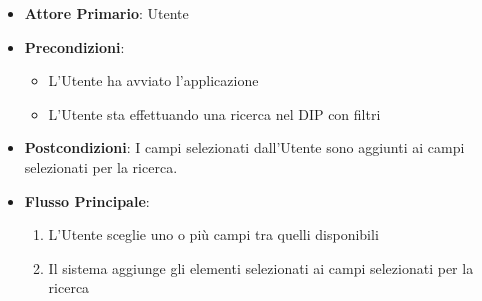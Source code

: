 \begin{itemize}
      \item \textbf{Attore Primario}: Utente
      \item \textbf{Precondizioni}: \begin{itemize}
            \item L'Utente ha avviato l'applicazione
            \item L'Utente sta effettuando una ricerca nel DIP con filtri
      \end{itemize}
      \item \textbf{Postcondizioni}:  I campi selezionati dall'Utente sono aggiunti ai campi selezionati per la ricerca.
      \item \textbf{Flusso Principale}:
      \begin{enumerate}
            \item L'Utente sceglie uno o più campi tra quelli disponibili
            \item Il sistema aggiunge gli elementi selezionati ai campi selezionati per la ricerca
      \end{enumerate}
\end{itemize}

